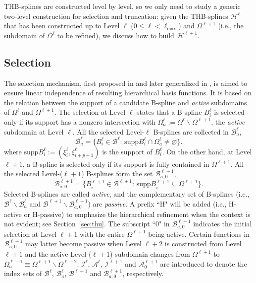 \documentclass[graybox]{svmult}
\begin{document}
THB-splines are constructed level by level, so we only need to study a generic two-level construction for selection and truncation: given the THB-splines $\mathcal{H}^{\ell}$ that has been constructed up to Level $\ell$ ($0\leq \ell <\ell_{\max}$) and $\Omega^{\ell+1}$ (i.e., the subdomain of $\Omega^\ell$ to be refined), we discuss how to build $\mathcal{H}^{\ell+1}$.

\subsection{Selection}
\label{sec:thb_select}

The selection mechanism, first proposed in \cite{ref:kraft97} and later generalized in \cite{ref:vuong11}, is aimed to ensure linear independence of resulting hierarchical basis functions. It is based on the relation between the support of a candidate B-spline and \emph{active} subdomains of $\Omega^\ell$ and $\Omega^{\ell+1}$. The selection at Level $\ell$ states that a B-spline $B_i^\ell$ is selected only if its support has a nonzero intersection with $\Omega_a^\ell:=\Omega^\ell\backslash \Omega^{\ell+1}$, the \emph{active} subdomain at Level $\ell$. All the selected Level-$\ell$ B-splines are collected in $\mathcal{B}_a^\ell$,
\begin{equation}
\mathcal{B}_a^\ell = \{ B_i^\ell \in \mathcal{B}^\ell :\, \mathrm{supp}B_i^\ell \cap \Omega_a^\ell \neq \varnothing\}.
\label{eq:select_h0}
\end{equation}
where $\mathrm{supp}B_i^\ell := (\xi_i^\ell, \xi_{i+p+1}^\ell)$ is the support of $B_i^{\ell}$. On the other hand, at Level $\ell+1$, a B-spline is selected only if its support is fully contained in $\Omega^{\ell+1}$. All the selected Level-($\ell+1$) B-splines form the set $\mathcal{B}_{a,0}^{\ell+1}$,
\begin{equation}
\mathcal{B}_{a,0}^{\ell+1} = \{ B_i^{\ell+1} \in \mathcal{B}^{\ell+1} :\, \mathrm{supp}B_i^{\ell+1} \subseteq \Omega^{\ell+1} \}.
\label{eq:select_h}
\end{equation}
Selected B-splines are called \emph{active}, and the complementary set of B-splines (i.e., $\mathcal{B}^\ell \backslash \mathcal{B}_a^\ell$ and $\mathcal{B}^{\ell+1} \backslash \mathcal{B}_{a,0}^{\ell+1}$) are \emph{passive}. A prefix ``H" will be added (i.e., H-active or H-passive) to emphasize the hierarchical refinement when the context is not evident; see Section~\ref{sec:thu}. The subscript ``0" in $\mathcal{B}_{a,0}^{\ell+1}$ indicates the initial selection at Level $\ell+1$ with the entire $\Omega^{\ell+1}$ being active. Certain functions in $\mathcal{B}_{a,0}^{\ell+1}$ may latter become passive when Level $\ell+2$ is constructed from Level $\ell+1$ and the active Level-($\ell+1$) subdomain changes from $\Omega^{\ell+1}$ to $\Omega_a^{\ell+1}\equiv \Omega^{\ell+1}\backslash \Omega^{\ell+2}$. $\mathcal{I}^\ell$, $\mathcal{A}^\ell$, $\mathcal{I}^{\ell+1}$ and $\mathcal{A}_0^{\ell+1}$ are introduced to denote the index sets of $\mathcal{B}^\ell$, $\mathcal{B}_a^\ell$, $\mathcal{B}^{\ell+1}$ and $\mathcal{B}_{a,0}^{\ell+1}$, respectively. 
\end{document}
